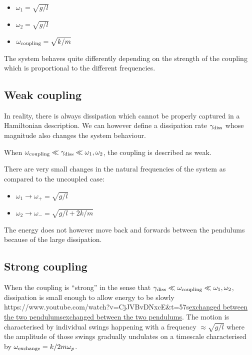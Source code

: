 \documentclass[
]{article}
\let\oldhref\href
\renewcommand{\href}[2]{\ifx#1\urlprefix\oldhref{#1}{#2}\else\uline{\oldhref{#1}{#2}}\fi}
\renewcommand{\[}{\begin{equation}}
\renewcommand{\]}{\end{equation}}
\providecommand{\tightlist}{%
  \setlength{\itemsep}{0pt}\setlength{\parskip}{0pt}}
\begin{document}
\begin{itemize}
\tightlist
\item
  \(\omega_1 = \sqrt{g/l}\)
\item
  \(\omega_2 = \sqrt{g/l}\)
\item
  \(\omega_{\rm coupling} = \sqrt{k/m}\)
\end{itemize}

The system behaves quite differently depending on the strength of the
coupling which is proportional to the different frequencies.

\subsection{Weak coupling}\label{weak-coupling}

In reality, there is always dissipation which cannot be properly
captured in a Hamiltonian description. We can however define a
dissipation rate \(\gamma_{\rm diss}\) whose magnitude also changes the
system behaviour.

When
\(\omega_{\rm coupling} \ll \gamma_{\rm diss} \ll \omega_1,\omega_2\),
the coupling is described as weak.

There are very small changes in the natural frequencies of the system as
compared to the uncoupled case:

\begin{itemize}
\tightlist
\item
  \(\omega_1 \rightarrow \omega_+ = \sqrt{g/l}\)
\item
  \(\omega_2 \rightarrow \omega_- = \sqrt{g/l + 2k/m}\)
\end{itemize}

The energy does not however move back and forwards between the pendulums
because of the large dissipation.

\subsection{Strong coupling}\label{strong-coupling}

When the coupling is ``strong'' in the sense that
\(\gamma_{\rm diss} \ll \omega_{\rm coupling} \ll \omega_1,\omega_2\),
dissipation is small enough to allow energy to be slowly
\href{https://www.youtube.com/watch?v=CjJVBvDNxcE&t=57s}{exchanged
between the two pendulums}. The motion is characterised by individual
swings happening with a frequency \(\approx \sqrt{g/l}\) where the
amplitude of those swings gradually undulates on a timescale
characterised by \(\omega_{\rm exchange} = k/2m\omega_p\).
\end{document}
